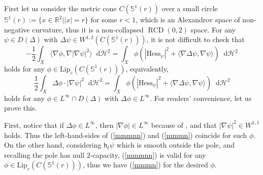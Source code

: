 \documentclass[11pt,reqno]{amsart}
\theoremstyle{definition}
\numberwithin{equation}{section}
\newcommand{\di}{\mathop{}\!\mathrm{d}}
\DeclareMathOperator{\RCD}{RCD}
\newcommand{\haus}{\mathscr{H}}
\begin{document}
First let us consider the metric cone $C(\mathbb{S}^1(r))$ over a small circle $\mathbb{S}^1(r):=\{x \in \mathbb{R}^2| |x|=r\}$ for some $r<1$, which is an Alexandrov space of non-negative curvature, thus it is a non-collapsed $\RCD(0, 2)$ space.
For any  $\psi \in D(\Delta)$ with $\Delta \psi \in W^{1,2}(C(\mathbb{S}^1(r)))$, it is not difficult to check that
\begin{equation}\label{mmmnn}
            -\frac{1}{2}\int_X\langle \nabla\phi, \nabla|\nabla \psi|^2\rangle\di \haus^2=\int_X\phi\left(|\mathrm{Hess}_{\psi}|^2+\langle \nabla \Delta \psi, \nabla \psi\rangle \right)\di \haus^2
        \end{equation}
holds for any $\phi \in \mathrm{Lip}_c(C(\mathbb{S}^1(r)))$, equivalently,
        \begin{equation}\label{mmmn}
            \frac{1}{2}\int_X\Delta \phi \cdot |\nabla \psi|^2\di \haus^2=\int_X\phi\left(|\mathrm{Hess}_{\psi}|^2+\langle \nabla \Delta \psi, \nabla \psi\rangle \right)\di \haus^2
        \end{equation}
        holds for any $\phi \in L^{\infty}\cap D(\Delta)$ with $\Delta\phi \in L^{\infty}$. For readers' convenience, let us prove this.

        First, notice that if $\Delta \phi \in L^{\infty}$, then $|\nabla \phi| \in L^{\infty}$ because of \cite[Theorem 3.1]{AMSbe}, and that $|\nabla \psi|^2 \in W^{1,1}$ holds. Thus the left-hand-sides of (\ref{mmmnn}) and (\ref{mmmn}) coincide for such $\phi$.
        On the other hand, considering $\mathsf{h}_t\psi$ which is smooth outside the pole, and recalling the pole has null $2$-capacity, (\ref{mmmnn}) is valid for any $\phi \in \mathrm{Lip}_c(C(\mathbb{S}^1(r)))$, thus we have (\ref{mmmn}) for the desired $\phi$.
\end{document}
